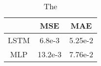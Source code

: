 \begin{table}[ht!]
    \centering
    \caption{The }
    \begin{tabular}{c | c c}
                    & \ac{MSE}  & \ac{MAE}  \\ \hline
        \ac{LSTM}   & 6.8e-3         & 5.25e-2         \\
        \ac{MLP}    & 13.2e-3         & 7.76e-2
    \end{tabular}
    \label{tab:case1-test-eval}
\end{table}